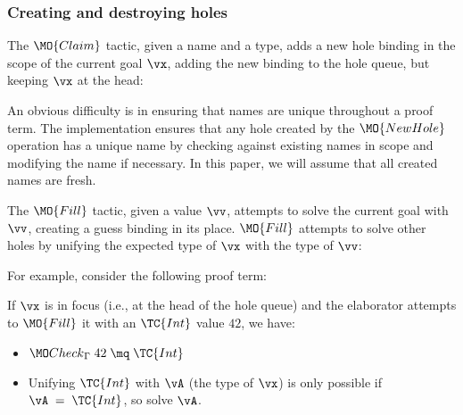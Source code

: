 \subsubsection{Creating and destroying holes}

The $\MO{Claim}$ tactic, given a name and a type, adds a new hole binding in
the scope of the current goal $\vx$, adding the new binding to the hole queue, but
keeping $\vx$ at the head:


An obvious difficulty is in ensuring that names are unique throughout a proof
term.  The implementation ensures that any hole created by the $\MO{NewHole}$
operation has a unique name by checking against existing names in scope and
modifying the name if necessary. In this paper, we will assume that all created
names are fresh.

The $\MO{Fill}$ tactic, given a value $\vv$, attempts to solve the current goal
with $\vv$, creating a guess binding in its place. $\MO{Fill}$ attempts to
solve other holes by unifying the expected type of $\vx$ with the type of $\vv$:


\noindent
For example, consider the following proof term:

\DM{
\AR{
\hole{\vA}{\Type}\SC\hole{\vk}{\Nat}\SC
\hole{\vx}{\vA}\SC\hole{\vxs}{\Vect\;\vA\;\vk}\SC
\\
\hole{\vys}{\Vect\;\vA\;(\suc\;\vk)}\SC\vys
}
}

\noindent
If $\vx$ is in focus (i.e., at the head of the hole queue) and the elaborator
attempts to
$\MO{Fill}$ it with an $\TC{Int}$ value $42$, we have:

\begin{itemize}
\item $\Check\;42\;\mq\;\TC{Int}$
\item Unifying $\TC{Int}$ with $\vA$ (the type of $\vx$) is only possible if
$\vA\;=\;\TC{Int}$, so solve $\vA$.
\end{itemize}

